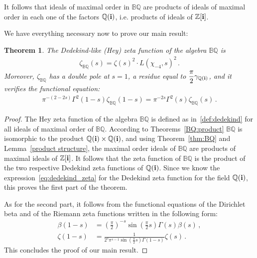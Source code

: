 \documentclass[reqno]{amsart}
\theoremstyle{plain}
\newtheorem{theorem}{Theorem}[section]
\theoremstyle{definition}
\theoremstyle{remark}
\numberwithin{equation}{section}
\begin{document}
\bigskip

\noindent It follows that ideals of maximal order in ${{\mathbb B}{\mathbb Q}}$ are
products of ideals of maximal order in each one of the factors
${{\mathbb Q}}({{\bf i}})$, i.e. products of ideals of ${{\mathbb Z}}[{{\bf i}}]$. 

We have everything necessary now to prove our main result:
\begin{theorem}
  \label{main}
  The Dedekind-like (Hey) zeta function of the algebra ${{\mathbb B}{\mathbb Q}}$ is
  \begin{align*}
    \zeta_{{\mathbb B}{\mathbb Q}}(s) = \zeta(s)^2\cdot L(\chi_{-4},s)^2\,.
  \end{align*}
  Moreover, $\zeta_{{\mathbb B}{\mathbb Q}}$ has a double pole at $s=1$, a residue
  equal to $\displaystyle\frac{\pi}{2}\gamma_{{{\mathbb Q}}({{\bf i}})}$, and it
  verifies the functional equation:
  \begin{align*}
    \pi^{-(2-2s)} \Gamma^2(1-s)\zeta_{{\mathbb B}{\mathbb Q}}(1-s) =
    \pi^{-2s} \Gamma^2(s)\zeta_{{\mathbb B}{\mathbb Q}}(s)\,.
  \end{align*}
\end{theorem}
\begin{proof}
  The Hey zeta function of the algebra ${{\mathbb B}{\mathbb Q}}$ is defined as
  in~\eqref{def:dedekind} for all ideals of maximal order of
  ${{\mathbb B}{\mathbb Q}}$. According to Theorems~\ref{BQ:product} ${{\mathbb B}{\mathbb Q}}$ is isomorphic to
  the product ${{\mathbb Q}}({{\bf i}})\times {{\mathbb Q}}({{\bf i}})$, and using Theorem~\ref{thm:BQ}
  and Lemma~\ref{product structure}, the maximal order ideals of ${{\mathbb B}{\mathbb Q}}$
  are products of maximal ideals of ${{\mathbb Z}}[{{\bf i}}]$. It follows that the zeta
  function of ${{\mathbb B}{\mathbb Q}}$ is the product of the two respective Dedekind zeta
  functions of ${{\mathbb Q}}({{\bf i}})$.  Since we know the
  expression~\eqref{eq:dedekind_zeta} for the Dedekind zeta function
  for the field ${{\mathbb Q}}({{\bf i}})$, this proves the first part of the theorem.

  As for the second part, it follows from the functional equations of
  the Dirichlet beta and of the Riemann zeta functions written in the
  following form:
  \begin{align*}
    \beta(1-s) &= \left(\frac\pi2\right)^{-s} \sin\left(\frac\pi2 s\right)
                 \Gamma(s)\beta(s)\,,\\
    \zeta(1-s) &= \frac{1}{2^s \pi^{s-1} \sin\left(\frac\pi2 s\right)\Gamma(1-s)}\zeta(s)\,.
  \end{align*}
  This concludes the proof of our main result.
\end{proof}
\end{document}
